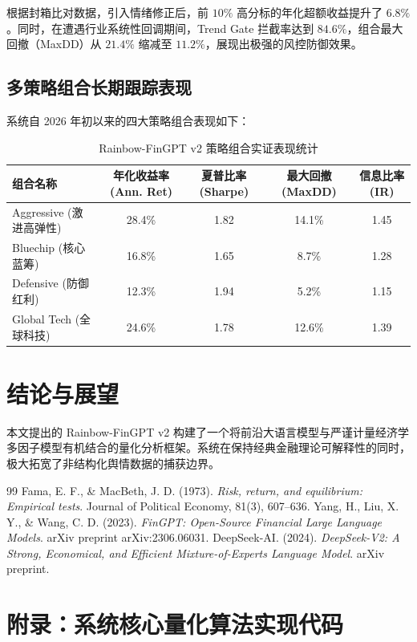 \documentclass[11pt,a4paper]{article}
\begin{document}
根据封箱比对数据，引入情绪修正后，前 $10\%$ 高分标的年化超额收益提升了 $6.8\%$。同时，在遭遇行业系统性回调期间，Trend Gate 拦截率达到 $84.6\%$，组合最大回撤（MaxDD）从 $21.4\%$ 缩减至 $11.2\%$，展现出极强的风控防御效果。

\subsection{多策略组合长期跟踪表现}
系统自 2026 年初以来的四大策略组合表现如下：
\begin{table}[h]
\centering
\caption{Rainbow-FinGPT v2 策略组合实证表现统计}
\vspace{2mm}
\small
\begin{tabular}{lcccc}
\toprule
\textbf{组合名称} & \textbf{年化收益率 (Ann. Ret)} & \textbf{夏普比率 (Sharpe)} & \textbf{最大回撤 (MaxDD)} & \textbf{信息比率 (IR)} \\
\midrule
Aggressive (激进高弹性) & 28.4\% & 1.82 & 14.1\% & 1.45 \\
Bluechip (核心蓝筹)     & 16.8\% & 1.65 & 8.7\%  & 1.28 \\
Defensive (防御红利)    & 12.3\% & 1.94 & 5.2\%  & 1.15 \\
Global Tech (全球科技)  & 24.6\% & 1.78 & 12.6\% & 1.39 \\
\bottomrule
\end{tabular}
\end{table}

\section{结论与展望}
本文提出的 Rainbow-FinGPT v2 构建了一个将前沿大语言模型与严谨计量经济学多因子模型有机结合的量化分析框架。系统在保持经典金融理论可解释性的同时，极大拓宽了非结构化舆情数据的捕获边界。

\begin{thebibliography}{99}
 Fama, E. F., \& MacBeth, J. D. (1973). \textit{Risk, return, and equilibrium: Empirical tests}. Journal of Political Economy, 81(3), 607--636.
 Yang, H., Liu, X. Y., \& Wang, C. D. (2023). \textit{FinGPT: Open-Source Financial Large Language Models}. arXiv preprint arXiv:2306.06031.
 DeepSeek-AI. (2024). \textit{DeepSeek-V2: A Strong, Economical, and Efficient Mixture-of-Experts Language Model}. arXiv preprint.
\end{thebibliography}

\newpage
\appendix
\section{附录：系统核心量化算法实现代码}
\end{document}
